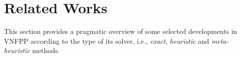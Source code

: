 
\section{Related Works}
\label{sec:lit_review}

%

This section provides a pragmatic overview of some selected developments in VNFPP according to the type of its solver, i.e., \textit{exact}, \textit{heuristic} and \textit{meta-heuristic} methods.

%


